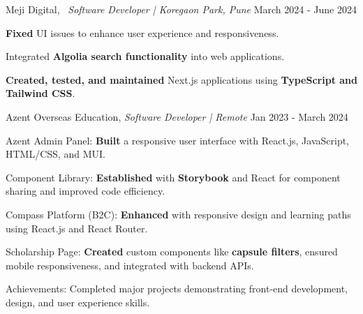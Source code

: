 
\begin{cventries2}

  \cventrynew
    {Meji Digital, \ \textnormal{\textit{Software Developer | Koregaon Park, Pune}}} %
    {March 2024 - June 2024} %
   {
    \begin{cvitems} %
      \item {{\bf Fixed} UI issues to enhance user experience and responsiveness.}
      \item {Integrated {\bf Algolia search functionality} into web applications.}
      \item {{\bf Created, tested, and maintained} Next.js applications using {\bf TypeScript and Tailwind CSS}.}
    \end{cvitems}
  }

  \cventrynew
    {Azent Overseas Education, \textnormal{\textit{Software Developer | Remote}}} %
    {Jan 2023 - March 2024} %
    {
      \begin{cvitems}
        \item {Azent Admin Panel: {\bf Built} a responsive user interface with React.js, JavaScript, HTML/CSS, and MUI.}
        \item {Component Library: {\bf Established} with {\bf Storybook} and React for component sharing and improved code efficiency.}
        \item {Compass Platform (B2C): {\bf Enhanced} with responsive design and learning paths using React.js and React Router.}
        \item {Scholarship Page: {\bf Created} custom components like {\bf capsule filters}, ensured mobile responsiveness, and integrated with backend APIs.}
        \item {Achievements: Completed major projects demonstrating front-end development, design, and user experience skills.}
      \end{cvitems}
    }


\end{cventries2}
